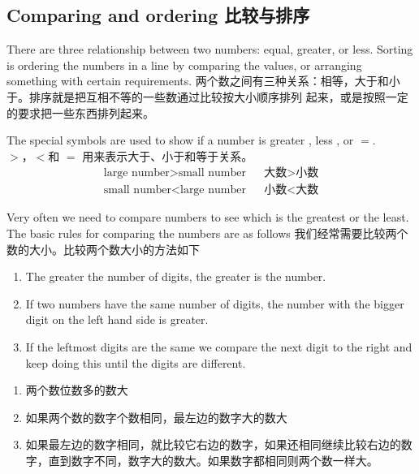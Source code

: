 \subsection{Comparing and ordering 比较与排序}
\begin{paracol}{2}
There are three relationship between two numbers: equal, greater, or less. Sorting is ordering the numbers in a line by comparing the values, or arranging something with certain requirements.
\switchcolumn[1]
两个数之间有三种关系：相等，大于和小于。排序就是把互相不等的一些数通过比较按大小顺序排列
起来，或是按照一定的要求把一些东西排列起来。
\end{paracol}
\begin{newthem}
The special symbols are used to show if a number is greater \bm{ $>$}, less \bm{$<$}, or $\bm{=}$.\\
$\bm{>}$，$\bm{<}$和 $\bm{=}$ 用来表示大于、小于和等于关系。
\begin{align}
\text{large number} > \text{small number} && \text{大数}>\text{小数}\\
\text{small number} < \text{large number} & &\text{小数}<\text{大数}
\end{align}
\end{newthem}

\begin{paracol}{2}
Very often we need to compare numbers to see which is the greatest or the least. The basic rules for comparing the numbers are as follows
\switchcolumn[1]
我们经常需要比较两个数的大小。比较两个数大小的方法如下
\end{paracol}

\begin{newalg}
\begin{enumerate}
\item The greater the number of digits, the greater is the number.
\item If two numbers have the same number of digits, the number with the bigger digit on the left hand side is greater.
\item If the leftmost digits are the same we compare the next digit to the right and keep doing this until the digits are different.
\end{enumerate}

\begin{enumerate}
\item 两个数位数多的数大
\item 如果两个数的数字个数相同，最左边的数字大的数大
\item 如果最左边的数字相同，就比较它右边的数字，如果还相同继续比较右边的数字，直到数字不同，数字大的数大。如果数字都相同则两个数一样大。
\end{enumerate}
\end{newalg}


